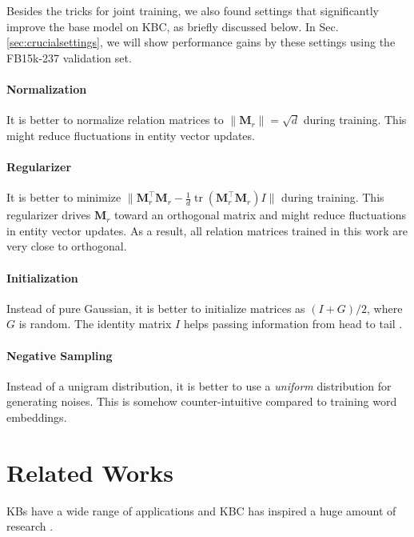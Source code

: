 \documentclass[11pt,a4paper]{article}
\newcommand{\mat}[1]{\bm{#1}}
\DeclareMathOperator*{\tr}{tr}
\begin{document}
Besides the tricks for joint training, we also found settings that 
significantly improve the base model on KBC, as briefly 
discussed below. In Sec.\ref{sec:crucialsettings}, we will show 
performance gains by these settings using the FB15k-237 validation set.

\paragraph{Normalization} It is better to normalize 
relation matrices to $\lVert\mat{M}_r\rVert=\sqrt{d}$ during training. 
This might reduce 
fluctuations in entity vector updates. 

\paragraph{Regularizer} It is better to minimize 
$\lVert \mat{M}_r^\top \mat{M}_r-\frac{1}{d}\tr(\mat{M}_r^\top \mat{M}_r)I\rVert$ during training. 
This regularizer drives $\mat{M}_r$ toward an orthogonal matrix 
\citep{tian-okazaki-inui:2016:P16-1} and might reduce 
fluctuations in entity vector updates. As a result, all relation matrices trained 
in this work are very close to orthogonal.

\paragraph{Initialization} Instead of pure Gaussian, it is better to initialize 
matrices as $(I+G)/2$, where $G$ is random. The identity matrix $I$ helps passing information from 
head to tail \citep{tian-okazaki-inui:2016:P16-1}.

\paragraph{Negative Sampling} Instead of a unigram distribution, it is better 
to use a \emph{uniform} distribution for generating noises. This is 
somehow counter-intuitive compared to training word embeddings. 

\section{Related Works}

KBs have a wide range of applications
\citep{berant-EtAl:2013:EMNLP,hixon-clark-hajishirzi:2015:NAACL-HLT,DBLP:journals/pieee/Nickel0TG16}
and KBC has inspired a huge amount of research 
\citep{DBLP:conf/nips/BordesUGWY13,riedel-EtAl:2013:NAACL-HLT,DBLP:conf/nips/SocherCMN13,DBLP:conf/aaai/WangZFC14,wang-EtAl:2014:EMNLP20145,DBLP:conf/ijcai/xiao16,nguyen-EtAl:2016:N16-1,
toutanova-EtAl:2016:P16-1,das-EtAl:2017:EACLlong1,hayashi-shimbo:2017:Short}. 
\end{document}
